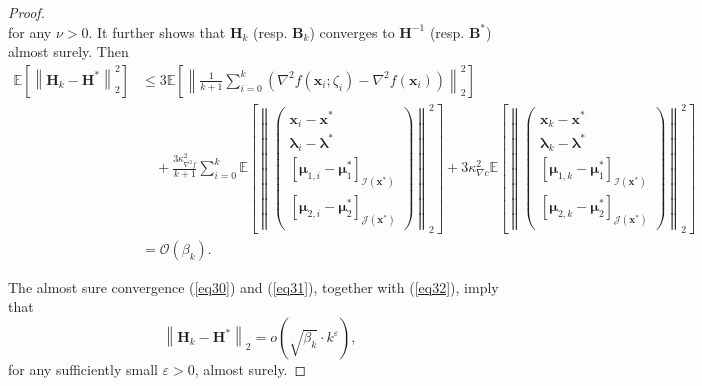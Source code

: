 \documentclass[aos]{imsart}
\numberwithin{equation}{section}
\theoremstyle{plain}
\begin{document}
\begin{appendix}
\begin{proof}
\begin{equation}
    \end{equation}
    for any $\nu > 0$.
    It further shows that $\bm{H}_k$ (resp. $\bm{B}_k$) converges to $\bm{H}^{-1}$ (resp. $\bm{B}^{*}$) almost surely.
    Then
    \begin{equation*}
        \begin{split}
            \mathbb{E} \left[  \left\| \bm{H}_k - \bm{H}^{*}\right\|_2^2 \right] & \leq 3 \mathbb{E} \left[  \left\| \frac{1}{k +1} \sum_{i=0}^{k} \left( \nabla^2 f(\bm{x}_i;\zeta_i) - \nabla^2 f(\bm{x}_i )\right) \right\|_2^2 \right] \\
            & \hspace{1em} + \frac{3\kappa_{\nabla^2 f}^2}{k +1} \sum_{i=0}^{k} \mathbb{E} \left[ \left\|  \left( \begin{array}{c}
    \bm{x}_{i} - \bm{x}^{*}  \\
    \bm{\lambda}_{i} - \bm{\lambda}^{*} \\
    \left[ \bm{\mu}_{1,i} - \bm{\mu}_{1}^{*}\right]_{\mathcal{I}(\bm{x}^{*})} \\
    \left[ \bm{\mu}_{2,i} - \bm{\mu}_{2}^{*} \right]_{\mathcal{J}(\bm{x}^{*})} 
    \end{array} \right)  \right\|_2^2 \right]  + 3 \kappa_{\nabla c}^2 \mathbb{E} \left[\left\|  \left( \begin{array}{c}
    \bm{x}_{k} - \bm{x}^{*}  \\
    \bm{\lambda}_{k} - \bm{\lambda}^{*} \\
    \left[ \bm{\mu}_{1,k} - \bm{\mu}_{1}^{*}\right]_{\mathcal{I}(\bm{x}^{*})} \\
    \left[ \bm{\mu}_{2,k} - \bm{\mu}_{2}^{*} \right]_{\mathcal{J}(\bm{x}^{*})} 
    \end{array} \right)  \right\|_2^2   \right] \\
    & = \mathcal{O}\left( \beta_k \right).
        \end{split}
    \end{equation*}

    The almost sure convergence (\ref{eq30}) and (\ref{eq31}), together with (\ref{eq32}), imply that 
    \begin{equation*}
         \left\| \bm{H}_k - \bm{H}^{*}\right\|_2 = o\left(\sqrt{\beta_k} \cdot k^{\varepsilon}  \right),
    \end{equation*}
    for any sufficiently small $\varepsilon > 0$, almost surely.
\end{proof}



\end{appendix}
\end{document}
